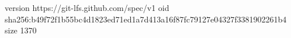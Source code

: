 version https://git-lfs.github.com/spec/v1
oid sha256:b49f72f1b55bc4d1823ed71ed1a7d413a16f87fc79127e04327f3381902261b4
size 1370
